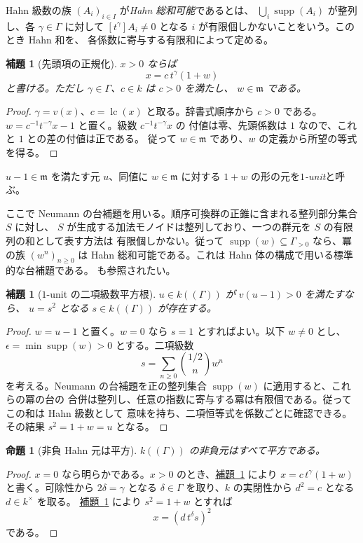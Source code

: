 \documentclass[11pt,uplatex,dvipdfmx]{jsarticle}
\newcommand{\Val}{v}
\newcommand{\Supp}{\operatorname{supp}}
\newcommand{\lc}{\operatorname{lc}}
\newcommand{\namedref}[2]{\hyperref[#2]{#1~\ref*{#2}}}
\theoremstyle{proofnote}
\newtheorem{proposition}[theorem]{命題}
\newtheorem{lemma}[theorem]{補題}
\begin{document}
Hahn 級数の族 \((A_i)_{i\in I}\) が\emph{Hahn 総和可能}であるとは、
\(\bigcup_i\Supp(A_i)\) が整列し、各 \(\gamma\in\Gamma\) に対して
\([t^\gamma]A_i\ne0\) となる \(i\) が有限個しかないことをいう。このとき Hahn 和を、
各係数に寄与する有限和によって定める。

\begin{lemma}[先頭項の正規化]
\label{lem:leading-term}
  \(x>0\) ならば
  \[
    x=c\,t^\gamma(1+w)
  \]
  と書ける。ただし \(\gamma\in\Gamma\)、\(c\in k\) は \(c>0\) を満たし、
  \(w\in\mathfrak m\) である。
\end{lemma}
\begin{proof}
  \(\gamma=\Val(x)\)、\(c=\lc(x)\) と取る。辞書式順序から \(c>0\) である。
  \(w=c^{-1}t^{-\gamma}x-1\) と置く。級数 \(c^{-1}t^{-\gamma}x\) の
  付値は零、先頭係数は \(1\) なので、これと \(1\) との差の付値は正である。
  従って \(w\in\mathfrak m\) であり、\(w\) の定義から所望の等式を得る。
\end{proof}

\(u-1\in\mathfrak m\) を満たす元 \(u\)、同値に \(w\in\mathfrak m\) に対する
\(1+w\) の形の元を\emph{\(1\)-unit}と呼ぶ。

ここで Neumann の台補題を用いる。順序可換群の正錐に含まれる整列部分集合 \(S\) に対し、
\(S\) が生成する加法モノイドは整列しており、一つの群元を \(S\) の有限列の和として表す方法は
有限個しかない。従って \(\Supp(w)\subseteq\Gamma_{>0}\) なら、冪の族
\((w^n)_{n\ge0}\) は Hahn 総和可能である。これは Hahn 体の構成で用いる標準的な台補題である。
\cite{EnglerPrestel}も参照されたい。

\begin{lemma}[\(1\)-unit の二項級数平方根]
\label{lem:positive-unit-square}
  \(u\in k((\Gamma))\) が \(\Val(u-1)>0\) を満たすなら、
  \(u=s^2\) となる \(s\in k((\Gamma))\) が存在する。
\end{lemma}
\begin{proof}
  \(w=u-1\) と置く。\(w=0\) なら \(s=1\) とすればよい。以下 \(w\ne0\) とし、
  \(\epsilon=\min\Supp(w)>0\) とする。二項級数
  \[
    s=\sum_{n\ge0}\binom{1/2}{n}w^n
  \]
  を考える。Neumann の台補題を正の整列集合 \(\Supp(w)\) に適用すると、これらの冪の台の
  合併は整列し、任意の指数に寄与する冪は有限個である。従ってこの和は Hahn 級数として
  意味を持ち、二項恒等式を係数ごとに確認できる。
  その結果 \(s^2=1+w=u\) となる。
\end{proof}

\begin{proposition}[非負 Hahn 元は平方]
\label{prop:hahn-squares}
  \(k((\Gamma))\) の非負元はすべて平方である。
\end{proposition}
\begin{proof}
  \(x=0\) なら明らかである。\(x>0\) のとき、\namedref{補題}{lem:leading-term} により
  \(x=c\,t^\gamma(1+w)\) と書く。可除性から
  \(2\delta=\gamma\) となる \(\delta\in\Gamma\) を取り、\(k\) の実閉性から
  \(d^2=c\) となる \(d\in k^\times\) を取る。
  \namedref{補題}{lem:positive-unit-square} により \(s^2=1+w\) とすれば
  \[
    x=(d\,t^\delta s)^2
  \]
  である。
\end{proof}
\end{document}
